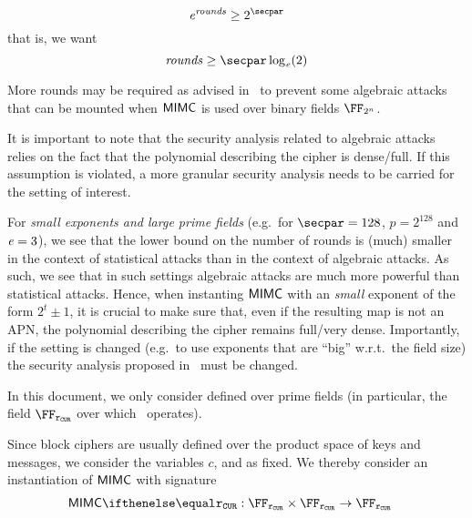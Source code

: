 \[
    \exponent{}^{\rounds} \geq 2^{\secpar}
\]
that is, we want
\[
    \rounds \geq \secpar \log_{\exponent}(2)
\]

\begin{remark}
    More rounds may be required as advised in~\cite{DBLP:conf/asiacrypt/Eichlseder0LORS20} to prevent some algebraic attacks that can be mounted when $\mathsf{MIMC{}}$ is used over binary fields $\FFx{2^n}$.
\end{remark}

It is important to note that the security analysis related to algebraic attacks relies on the fact that the polynomial describing the cipher is dense/full. If this assumption is violated, a more granular security analysis needs to be carried for the setting of interest.

\begin{notebox}
    For \emph{small exponents and large prime fields} (e.g.~for $\secpar = 128$, $p = 2^{128}$ and $\mathit{e}{} = 3$), we see that the lower bound on the number of rounds is (much) smaller in the context of statistical attacks than in the context of algebraic attacks. As such, we see that in such settings algebraic attacks are much more powerful than statistical attacks. Hence, when instanting $\mathsf{MIMC{}}$ with an \emph{small} exponent of the form $2^t \pm 1$, it is crucial to make sure that, even if the resulting map is not an APN, the polynomial describing the cipher remains full/very dense. Importantly, if the setting is changed (e.g.~to use exponents that are ``big'' w.r.t.~the field size) the security analysis proposed in~\cite{albrecht2016mimc} must be changed.
\end{notebox}

\medskip

In this document, we only consider \mimc{} defined over prime fields (in particular, the field $\FFx{\rCURVE}$ over which \zksnark~operates).

Since block ciphers are usually defined over the product space of keys and messages, we consider the variables $c$, \rounds{} and \exponent{} as fixed. We thereby consider an instantiation of $\mathsf{MIMC{}}$ with signature
\begin{align*}
    \mimcPrime{\rCURVE} &: \FFx{\rCURVE} \times \FFx{\rCURVE} \to \FFx{\rCURVE}
\end{align*}

